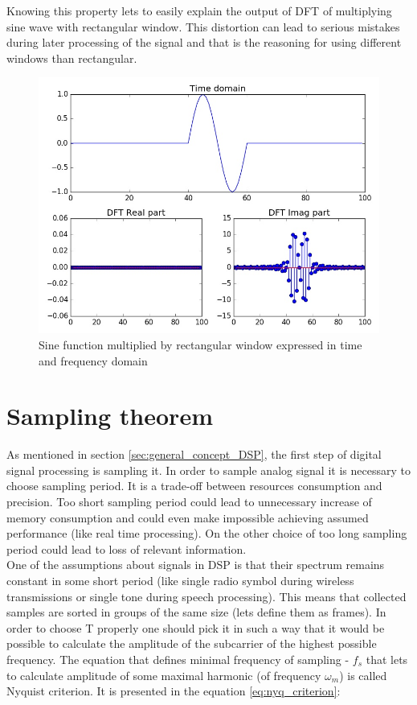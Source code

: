\documentclass[magister]{dyplom}
\begin{document}
	Knowing this property lets to easily explain the output of \gls{DFT} of multiplying sine wave with rectangular window. This distortion can lead to serious mistakes during later processing of the signal and that is the reasoning for using different windows than rectangular.

	\begin{figure} [!th]
		\centering
		\includegraphics[width=0.7\linewidth]{images/m_sine_rect}
		\caption{Sine function multiplied by rectangular window expressed in time and frequency domain}
		\label{fig:m_sine_rect}
	\end{figure}

\FloatBarrier
	
	\section{Sampling theorem}	

	As mentioned in section \ref{sec:general_concept_DSP}, the first step of digital signal processing is sampling it. In order to sample analog signal it is necessary to choose sampling period. It is a trade-off between resources consumption and precision. Too short sampling period could lead to unnecessary increase of memory consumption and could even make impossible achieving assumed performance (like real time processing). On the other choice of too long sampling period could lead to loss of relevant information.\\
	
	One of the assumptions about signals in \gls{DSP} is that their spectrum remains constant in some short period (like single radio symbol during wireless transmissions or single tone during speech processing). This means that collected samples are sorted in groups of the same size (lets define them as frames). In order to choose \gls{T} properly one should pick it in such a way that it would be possible to calculate the amplitude of the subcarrier of the highest possible frequency. The equation that defines minimal frequency of sampling - $f_s$ that lets to calculate amplitude of some maximal harmonic (of frequency $\omega_m$) is called Nyquist criterion. It is presented in the equation \ref{eq:nyq_criterion}:
	
\end{document}
